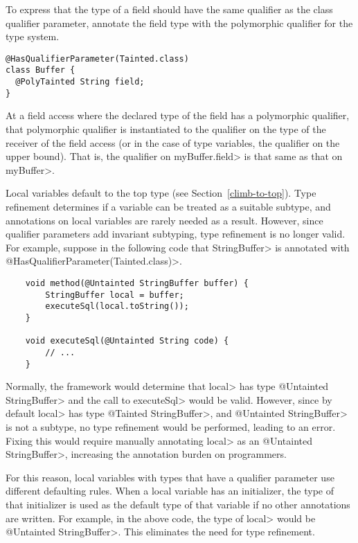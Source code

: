 
To express that the type of a field
should have the same qualifier as the class qualifier parameter,
annotate the field type with the polymorphic qualifier for the type system.

\begin{Verbatim}
@HasQualifierParameter(Tainted.class)
class Buffer {
  @PolyTainted String field;
}
\end{Verbatim}

At a field access where the declared type of the field has a polymorphic
qualifier, that polymorphic qualifier is instantiated to the qualifier on the
type of the receiver of the field access (or in the case of type variables, the
qualifier on the upper bound).  That is, the qualifier on \<myBuffer.field>
is that same as that on \<myBuffer>.


Local variables default to the top type (see
Section~\ref{climb-to-top}). Type refinement determines if a variable can be
treated as a suitable subtype, and annotations on local variables are rarely
needed as a result. However, since qualifier parameters add invariant subtyping,
type refinement is no longer valid. For example, suppose in the following code
that \<StringBuffer> is annotated with \<@HasQualifierParameter(Tainted.class)>.

\begin{Verbatim}
    void method(@Untainted StringBuffer buffer) {
        StringBuffer local = buffer;
        executeSql(local.toString());
    }

    void executeSql(@Untainted String code) {
        // ...
    }
\end{Verbatim}

Normally, the framework would determine that \<local> has type \<@Untainted
StringBuffer> and the call to \<executeSql> would be valid. However, since by
default \<local> has type \<@Tainted StringBuffer>, and
\<@Untainted StringBuffer> is not a subtype, no type refinement would be
performed, leading to an error. Fixing this would require manually annotating
\<local> as an \<@Untainted StringBuffer>, increasing the annotation burden on
programmers.

For this reason, local variables with types that have a qualifier parameter use
different defaulting rules. When a local variable has an initializer, the type
of that initializer is used as the default type of that variable if no other
annotations are written. For example, in the above code, the type of \<local>
would be \<@Untainted StringBuffer>. This eliminates the need for type
refinement.

